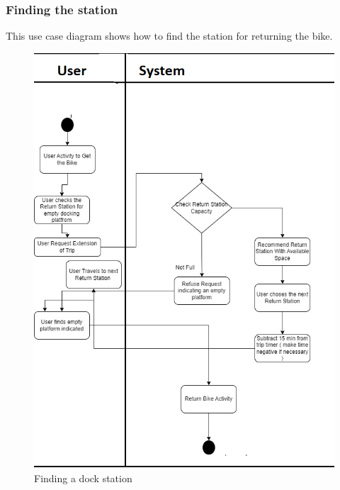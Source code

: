 \subsubsection{Finding the station}
This use case diagram shows how to find the station for returning the bike.
\begin{figure}[H]
  \centering
  \includegraphics[scale = 0.70]{images/UserActivityfindingStation.png}
  \caption{Finding a dock station}
  \label{fig:finding_station}
\end{figure}
\newpage
